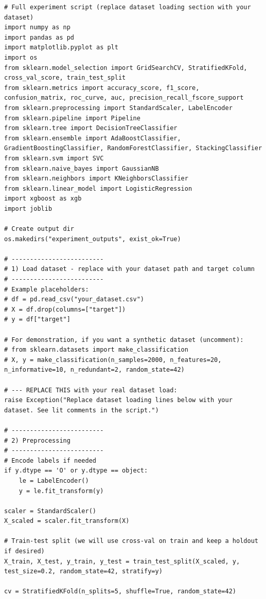 \documentclass[11pt]{article}
\begin{document}
\begin{lstlisting}
# Full experiment script (replace dataset loading section with your dataset)
import numpy as np
import pandas as pd
import matplotlib.pyplot as plt
import os
from sklearn.model_selection import GridSearchCV, StratifiedKFold, cross_val_score, train_test_split
from sklearn.metrics import accuracy_score, f1_score, confusion_matrix, roc_curve, auc, precision_recall_fscore_support
from sklearn.preprocessing import StandardScaler, LabelEncoder
from sklearn.pipeline import Pipeline
from sklearn.tree import DecisionTreeClassifier
from sklearn.ensemble import AdaBoostClassifier, GradientBoostingClassifier, RandomForestClassifier, StackingClassifier
from sklearn.svm import SVC
from sklearn.naive_bayes import GaussianNB
from sklearn.neighbors import KNeighborsClassifier
from sklearn.linear_model import LogisticRegression
import xgboost as xgb
import joblib

# Create output dir
os.makedirs("experiment_outputs", exist_ok=True)

# -------------------------
# 1) Load dataset - replace with your dataset path and target column
# -------------------------
# Example placeholders:
# df = pd.read_csv("your_dataset.csv")
# X = df.drop(columns=["target"])
# y = df["target"]

# For demonstration, if you want a synthetic dataset (uncomment):
# from sklearn.datasets import make_classification
# X, y = make_classification(n_samples=2000, n_features=20, n_informative=10, n_redundant=2, random_state=42)

# --- REPLACE THIS with your real dataset load:
raise Exception("Replace dataset loading lines below with your dataset. See lit comments in the script.")

# -------------------------
# 2) Preprocessing
# -------------------------
# Encode labels if needed
if y.dtype == 'O' or y.dtype == object:
    le = LabelEncoder()
    y = le.fit_transform(y)

scaler = StandardScaler()
X_scaled = scaler.fit_transform(X)

# Train-test split (we will use cross-val on train and keep a holdout if desired)
X_train, X_test, y_train, y_test = train_test_split(X_scaled, y, test_size=0.2, random_state=42, stratify=y)

cv = StratifiedKFold(n_splits=5, shuffle=True, random_state=42)


\end{lstlisting}
\end{document}
